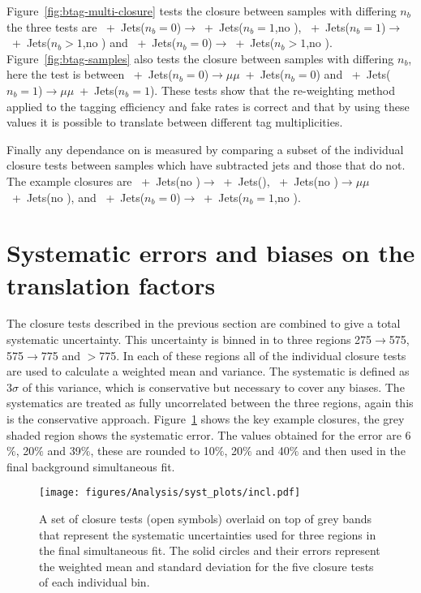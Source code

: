 Figure~\ref{fig:btag-multi-closure} tests the closure between samples with 
differing $n_{b}$ the three tests are \Pmu~+~Jets($n_b = 0$)$\rightarrow$\Pmu~+~Jets($n_b = 
1$,no \alt), \Pmu~+~Jets($n_b = 1$)$\rightarrow$\Pmu~+~Jets($n_b > 1$,no \alt) and \Pmu~+~Jets($n_b = 
0$)$\rightarrow$\Pmu~+~Jets($n_b > 1$,no \alt). Figure~\ref{fig:btag-samples} also 
tests the closure between samples with differing $n_{b}$, here the test is 
between \Pmu~+~Jets($n_b = 0$)$\rightarrow$$\mu\mu$~+~Jets($n_b = 0$) and \Pmu~+~Jets($n_b =  
1$)$\rightarrow$$\mu\mu$~+~Jets($n_b = 1$). These tests show that the re-weighting method applied to the \Pbottom tagging efficiency and fake rates is correct and that by using these values it is possible to translate between different \Pbottom tag multiplicities.

Finally any dependance on \pu is measured by comparing a subset of the 
individual closure tests between samples which have \pu subtracted jets and 
those that do not. The example closures are \Pmu~+~Jets(no \alt)$\rightarrow$\Pmu~+~Jets(\altg),
\Pmu~+~Jets(no \alt)$\rightarrow$$\mu\mu$~+~Jets(no \alt), and \Pmu~+~Jets($n_b = 0$)$\rightarrow$\Pmu~+~Jets($n_b 
= 1$,no \alt).

\section{Systematic errors and biases on the translation factors}
\label{sub:motivating_the_combined_systematic_on_the_translation_factors}
The closure tests described in the previous section are combined to give a 
total systematic uncertainty. This uncertainty is binned in to three \HT 
regions \unit{275}{\GeV}$\rightarrow$\unit{575}{\GeV}, 
\unit{575}{\GeV}$\rightarrow$\unit{775}{\GeV} and $>$\unit{775}{\GeV}. In each 
of these regions all of the individual closure tests are used to calculate a 
weighted mean and variance. The systematic is defined as $3\sigma$ of this 
variance, which is conservative but necessary to cover any biases. The 
systematics are treated as fully uncorrelated between the three regions, again 
this is the conservative approach. Figure~\ref{fig:closure-summary} shows the 
key example closures, the grey shaded region shows the systematic error. The 
values obtained for the error are 6$\%$, 20$\%$ and 39$\%$, these are rounded 
to 10$\%$, 20$\%$ and 40$\%$ and then used in the final background simultaneous 
fit.

\begin{figure}[!h]
  \begin{center}
    \texttt{[image: figures/Analysis/syst\_plots/incl.pdf]}
    \caption{A set of closure tests (open symbols) overlaid on top of
      grey bands that represent the systematic uncertainties used for
      three \HT regions in the final simultaneous fit. The solid
      circles and their errors represent the weighted mean and
      standard deviation for the five closure tests of each individual
      \HT bin.}
    \label{fig:closure-summary}
  \end{center}
\end{figure}

